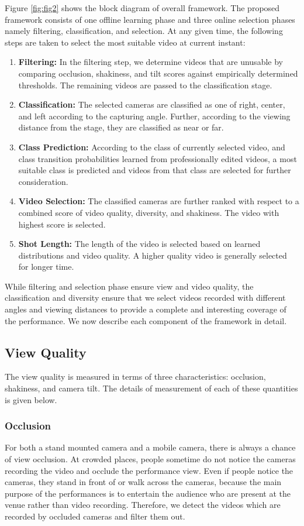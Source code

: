 \documentclass{sig-alternate}
\begin{document}
Figure \ref{fig:fig2} shows the block diagram of overall framework. The proposed framework consists of one offline learning phase and three online selection phases namely filtering, classification, and selection. At any given time, the following steps are taken to select the most suitable video at current instant:
 \begin{enumerate} 
    \item \textbf{Filtering:} In the filtering step, we determine videos that are unusable by comparing occlusion, shakiness, and tilt scores against empirically determined thresholds. The remaining
    videos are passed to the classification stage.
    \item \textbf{Classification:} The selected cameras are classified as one of right, center, and left according to the capturing angle. Further, according to the viewing distance from the stage, they are classified as near or far.
    \item \textbf{Class Prediction:} According to the class of currently selected video, and class transition probabilities learned from professionally edited videos, a most suitable class is predicted
    and videos from that class are selected for further consideration.
    \item \textbf{Video Selection:} The classified cameras are further ranked with respect to a combined score of video quality, diversity, and shakiness. The video with highest score is selected.
    \item \textbf{Shot Length:} The length of the video is selected based on learned distributions and video quality. A higher quality video is generally selected for longer time.
 \end{enumerate} 
While filtering and selection phase ensure view and video quality, the classification and diversity ensure that we select videos recorded with different angles and viewing distances to provide a complete and interesting coverage of the performance. We now
describe each component of the framework in detail.

\subsection{View Quality}
The view quality is measured in terms of three characteristics: occlusion, shakiness, and camera tilt. The details of measurement of each of these quantities is given below.
\subsubsection{Occlusion}
For both a stand mounted camera and a mobile camera, there is always a chance of view occlusion. At crowded places, people sometime do not notice the cameras recording the video and occlude the performance view. Even if people notice the cameras,
they stand in front of or walk across the cameras, because the main purpose of the performances is to entertain the audience who are present at the venue rather than video recording. Therefore, we detect
the videos which are recorded by occluded cameras and filter them out.
\end{document}
